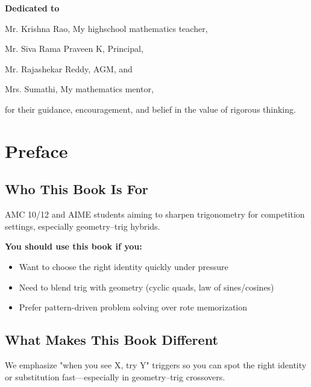 \documentclass[12pt]{extarticle}
\begin{document}
\thispagestyle{empty}
\vspace*{\fill}
\begin{center}
\Large

\textbf{Dedicated to}

\vspace{1cm}

Mr. Krishna Rao, My highschool mathematics teacher,

Mr. Siva Rama Praveen K, Principal,

Mr. Rajashekar Reddy, AGM, and

Mrs. Sumathi, My mathematics mentor,

\vspace{1cm}

for their guidance, encouragement, and belief in the value of rigorous thinking.
\end{center}
\vspace*{\fill}

\newpage

	\tableofcontents
\newpage

\section*{Preface}

\subsection*{Who This Book Is For}
AMC 10/12 and AIME students aiming to sharpen trigonometry for competition settings, especially geometry–trig hybrids.

\textbf{You should use this book if you:}
\begin{itemize}
  \item Want to choose the right identity quickly under pressure
  \item Need to blend trig with geometry (cyclic quads, law of sines/cosines)
  \item Prefer pattern-driven problem solving over rote memorization
\end{itemize}

\subsection*{What Makes This Book Different}
We emphasize "when you see X, try Y" triggers so you can spot the right identity or substitution fast—especially in geometry–trig crossovers.
\end{document}
